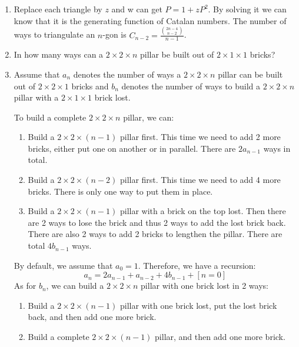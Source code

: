 \documentclass[12pt,a4paper]{article}
\makeatletter
\newtheorem*{solution}{Solution}
\theoremstyle{definition}
\renewenvironment{solution}[1][Solution] {\par\pushQED{\qed}\normalfont\topsep6\p@\@plus6\p@\relax\trivlist\item[\hskip\labelsep\bfseries#1\@addpunct{.}]\ignorespaces}{\popQED\endtrivlist\@endpefalse} \makeatother
\makeatother
\begin{document}
\begin{enumerate}
\begin{solution}
        	Replace each triangle by $z$ and w can get $P=1+zP^2$. By solving it we can know that it is the generating function of Catalan numbers. The number of ways to triangulate an $n$-gon is $C_{n-2}=\frac{\binom{2n-4}{n-2}}{n-1}$.
        \end{solution}
    \item 
        In how many ways can a $2 \times 2 \times n$ pillar be built out of $2 \times 1 \times 1$ bricks?
        \begin{solution}
        	Assume that $a_n$ denotes the number of ways a $2 \times 2 \times n$ pillar can be built out of $2 \times 2 \times 1$ bricks and $b_n$ denotes the number of ways to build a $2 \times 2 \times n$ pillar with a $2 \times 1 \times 1$ brick lost.
        	
        	To build a complete $2 \times 2 \times n$ pillar, we can:
        	\begin{enumerate}
        		\item 
        		    Build a $2 \times 2 \times (n-1)$ pillar first. This time we need to add 2 more bricks, either put one on another or in parallel. There are $2a_{n-1}$ ways in total.
        		\item 
        		    Build a $2 \times 2 \times (n-2)$ pillar first. This time we need to add 4 more bricks. There is only one way to put them in place.
        		\item 
        		    Build a $2 \times 2 \times (n-1)$ pillar with a brick on the top lost. Then there are 2 ways to lose the brick and thus 2 ways to add the lost brick back. There are also 2 ways to add 2 bricks to lengthen the pillar. There are total $4b_{n-1}$ ways.
        	\end{enumerate}
            By default, we assume that $a_0=1$.
            Therefore, we have a recursion:
            \begin{equation*}
                a_n=2a_{n-1}+a_{n-2}+4b_{n-1}+[n=0]
            \end{equation*}
            As for $b_n$, we can build a $2\times2\times n$ pillar with one brick lost in 2 ways:
            \begin{enumerate}
            	\item 
            	    Build a $2\times2\times (n-1)$ pillar with one brick lost, put the lost brick back, and then add one more brick.
            	\item 
            	    Build a complete $2 \times 2 \times (n-1)$ pillar, and then add one more brick. 
            \end{enumerate}

\end{solution}
\end{enumerate}
\end{document}
